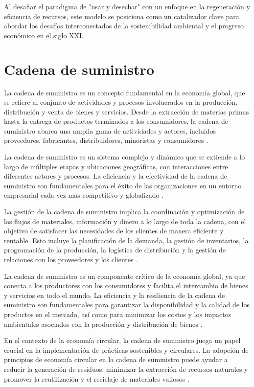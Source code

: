 \documentclass[main.tex]{subfiles}
\begin{document}
Al desafiar el paradigma de "usar y desechar" con un enfoque en la regeneración y eficiencia de recursos, este modelo se posiciona como un catalizador clave para abordar los desafíos interconectados de la sostenibilidad ambiental y el progreso económico en el siglo XXI.

\section{Cadena de suministro}

La cadena de suministro es un concepto fundamental en la economía global, que se refiere al conjunto de actividades y procesos involucrados en la producción, distribución y venta de bienes y servicios. Desde la extracción de materias primas hasta la entrega de productos terminados a los consumidores, la cadena de suministro abarca una amplia gama de actividades y actores, incluidos proveedores, fabricantes, distribuidores, minoristas y consumidores \cite{christopher2016logistics}.

La cadena de suministro es un sistema complejo y dinámico que se extiende a lo largo de múltiples etapas y ubicaciones geográficas, con interacciones entre diferentes actores y procesos. La eficiencia y la efectividad de la cadena de suministro son fundamentales para el éxito de las organizaciones en un entorno empresarial cada vez más competitivo y globalizado \cite{christopher2016logistics}.

La gestión de la cadena de suministro implica la coordinación y optimización de los flujos de materiales, información y dinero a lo largo de toda la cadena, con el objetivo de satisfacer las necesidades de los clientes de manera eficiente y rentable. Esto incluye la planificación de la demanda, la gestión de inventarios, la programación de la producción, la logística de distribución y la gestión de relaciones con los proveedores y los clientes \cite{christopher2016logistics}.

La cadena de suministro es un componente crítico de la economía global, ya que conecta a los productores con los consumidores y facilita el intercambio de bienes y servicios en todo el mundo. La eficiencia y la resiliencia de la cadena de suministro son fundamentales para garantizar la disponibilidad y la calidad de los productos en el mercado, así como para minimizar los costos y los impactos ambientales asociados con la producción y distribución de bienes \cite{christopher2016logistics}.

En el contexto de la economía circular, la cadena de suministro juega un papel crucial en la implementación de prácticas sostenibles y circulares. La adopción de principios de economía circular en la cadena de suministro puede ayudar a reducir la generación de residuos, minimizar la extracción de recursos naturales y promover la reutilización y el reciclaje de materiales valiosos \cite{melendez2021economia}.
\end{document}

